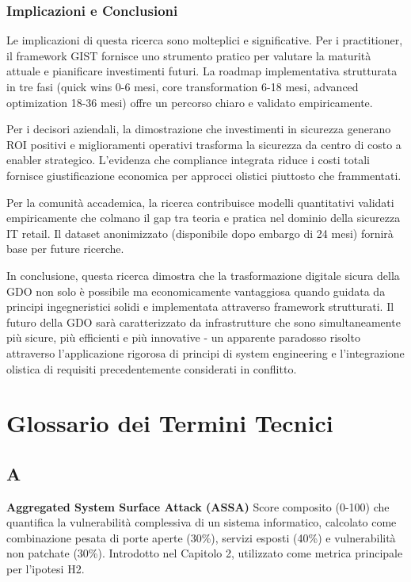 \documentclass{report}
\begin{document}
\subsubsection{Implicazioni e
Conclusioni}\label{implicazioni-e-conclusioni}

Le implicazioni di questa ricerca sono molteplici e significative. Per i
practitioner, il framework GIST fornisce uno strumento pratico per
valutare la maturità attuale e pianificare investimenti futuri. La
roadmap implementativa strutturata in tre fasi (quick wins 0-6 mesi,
core transformation 6-18 mesi, advanced optimization 18-36 mesi) offre
un percorso chiaro e validato empiricamente.

Per i decisori aziendali, la dimostrazione che investimenti in sicurezza
generano ROI positivi e miglioramenti operativi trasforma la sicurezza
da centro di costo a enabler strategico. L'evidenza che compliance
integrata riduce i costi totali fornisce giustificazione economica per
approcci olistici piuttosto che frammentati.

Per la comunità accademica, la ricerca contribuisce modelli quantitativi
validati empiricamente che colmano il gap tra teoria e pratica nel
dominio della sicurezza IT retail. Il dataset anonimizzato (disponibile
dopo embargo di 24 mesi) fornirà base per future ricerche.

In conclusione, questa ricerca dimostra che la trasformazione digitale
sicura della GDO non solo è possibile ma economicamente vantaggiosa
quando guidata da principi ingegneristici solidi e implementata
attraverso framework strutturati. Il futuro della GDO sarà
caratterizzato da infrastrutture che sono simultaneamente più sicure,
più efficienti e più innovative - un apparente paradosso risolto
attraverso l'applicazione rigorosa di principi di system engineering e
l'integrazione olistica di requisiti precedentemente considerati in
conflitto.

\section{Glossario dei Termini
Tecnici}\label{glossario-dei-termini-tecnici}

\subsection{A}\label{a}

\textbf{Aggregated System Surface Attack (ASSA)} Score composito (0-100)
che quantifica la vulnerabilità complessiva di un sistema informatico,
calcolato come combinazione pesata di porte aperte (30\%), servizi
esposti (40\%) e vulnerabilità non patchate (30\%). Introdotto nel
Capitolo 2, utilizzato come metrica principale per l'ipotesi H2.
\end{document}

